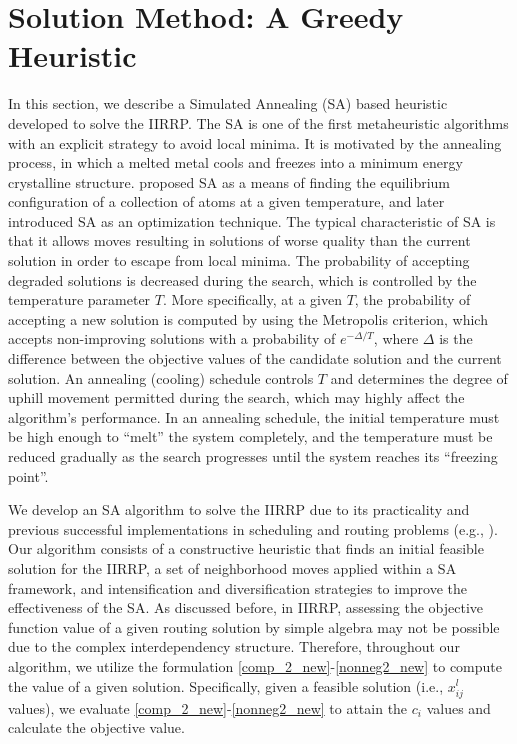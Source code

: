 \documentclass[11pt]{article}
\begin{document}
\section{Solution Method: A Greedy Heuristic}  \label{s:solutionmethod}

In this section, we describe a Simulated Annealing (SA) based heuristic developed to solve the IIRRP. The SA is one of the first metaheuristic algorithms with an explicit strategy to avoid local minima. It is motivated by the annealing process, in which a melted metal cools and freezes into a minimum energy crystalline structure. \cite{metropolis1953} proposed SA as a means of finding the equilibrium configuration of a collection of atoms at a given temperature, and later \cite{kirkpatrick_optimization_1983} introduced SA as an optimization technique. The typical characteristic of SA is that it allows moves resulting in solutions of worse quality than the current solution in order to escape from local minima. The probability of accepting degraded solutions is decreased during the search, which is controlled by the temperature parameter $T$. More specifically, at a given $T$, the probability of accepting a new solution is computed by using the Metropolis criterion, which accepts non-improving solutions with a probability of $e^{-\Delta/T}$, where $\Delta$ is the difference between the objective values of the candidate solution and the current solution. An annealing (cooling) schedule controls $T$ and determines the degree of uphill movement permitted during the search, which may highly affect the algorithm's performance. In an annealing schedule, the initial temperature must be high enough to ``melt'' the system completely, and the temperature must be reduced gradually as the search progresses until the system reaches its ``freezing point''. 


We develop an SA algorithm to solve the IIRRP due to its practicality and previous successful implementations in scheduling and routing problems (e.g., \citet{li2005, afifi2016}). Our algorithm consists of a constructive heuristic that finds an initial feasible solution for the IIRRP, a set of neighborhood moves applied within a SA framework, and intensification and diversification strategies to improve the effectiveness of the SA. As discussed before, in IIRRP, assessing the objective function value of a given routing solution by simple algebra may not be possible due to the complex interdependency structure. Therefore, throughout our algorithm, we utilize the formulation \eqref{comp_2_new}-\eqref{nonneg2_new} to compute the value of a given solution. Specifically, given a feasible solution (i.e., $x^l_{ij}$ values), we evaluate \eqref{comp_2_new}-\eqref{nonneg2_new} to attain the $c_i$ values and calculate the objective value. 
\end{document}
